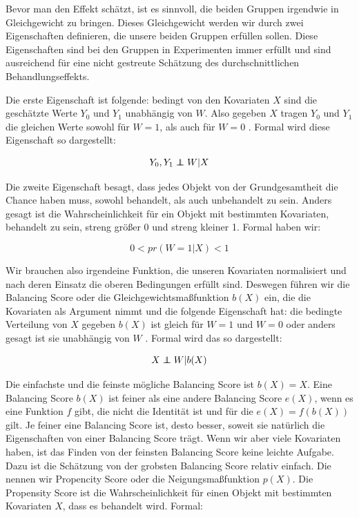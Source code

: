 \documentclass[12pt,a4paper,twoside]{scrartcl}
\numberwithin{equation}{section}
\newcommand\independent{\protect\mathpalette{\protect\independenT}{\perp}}
\def\independenT#1#2{\mathrel{\rlap{$#1#2$}\mkern2mu{#1#2}}}
\begin{document}
\noindent
Bevor man den Effekt schätzt, ist es sinnvoll, die beiden Gruppen irgendwie in Gleichgewicht zu bringen. Dieses Gleichgewicht werden wir durch zwei Eigenschaften definieren, die unsere beiden Gruppen erfüllen sollen. Diese Eigenschaften sind bei den Gruppen in Experimenten immer erfüllt und sind ausreichend für eine nicht gestreute Schätzung des durchschnittlichen Behandlungseffekts.\par

\noindent
Die erste Eigenschaft ist folgende: bedingt von den Kovariaten $X$ sind die geschätzte Werte $Y_0$ und $Y_1$ unabhängig von $W$. Also gegeben $X$ tragen $Y_0$ und $Y_1$ die gleichen Werte sowohl für $W = 1$, als auch für $W = 0$ \cite{rosenbaum1983central}. Formal wird diese Eigenschaft so dargestellt:\par
 
\begin{equation}\label{eq:2.3}
  Y_0,Y_1 \independent W|X
\end{equation}

\noindent
Die zweite Eigenschaft besagt, dass jedes Objekt von der Grundgesamtheit die Chance haben muss, sowohl behandelt, als auch unbehandelt zu sein. Anders gesagt ist die Wahrscheinlichkeit für ein Objekt mit bestimmten Kovariaten, behandelt zu sein, streng größer 0 und streng kleiner 1\cite{rosenbaum1983central}. Formal haben wir:\par

\begin{equation}\label{eq:2.4}
 0 < pr(W=1|X)<1
\end{equation}

\noindent
Wir brauchen also irgendeine Funktion, die unseren Kovariaten normalisiert und nach deren Einsatz die oberen Bedingungen erfüllt sind. Deswegen führen wir die Balancing Score oder die Gleichgewichtsmaßfunktion $b(X)$ ein, die die Kovariaten als Argument nimmt und die folgende Eigenschaft hat: die bedingte Verteilung von $X$ gegeben $b(X)$ ist gleich für $W = 1$ und $W = 0$ oder anders gesagt ist sie unabhängig von $W$ \cite{dawid1976properties}. Formal wird das so dargestellt:\par

\begin{equation}\label{eq:2.5}
  X \independent W|b(X)
\end{equation}

\noindent     
Die einfachste und die feinste mögliche Balancing Score ist $b(X) = X$. Eine Balancing Score $b(X)$ ist feiner als eine andere Balancing Score $e(X)$, wenn es eine Funktion $f$ gibt, die nicht die Identität ist und für die $e(X) = f(b(X))$ gilt. Je feiner eine Balancing Score ist, desto besser, soweit sie natürlich die Eigenschaften von einer Balancing Score trägt. Wenn wir aber viele Kovariaten haben, ist das Finden von der feinsten Balancing Score keine leichte Aufgabe. Dazu ist die Schätzung von der grobsten Balancing Score relativ einfach. Die nennen wir Propencity Score oder die Neigungsmaßfunktion $p(X)$. Die Propensity Score ist die Wahrscheinlichkeit für einen Objekt mit bestimmten Kovariaten $X$, dass es behandelt wird. Formal: \par 
\end{document}

